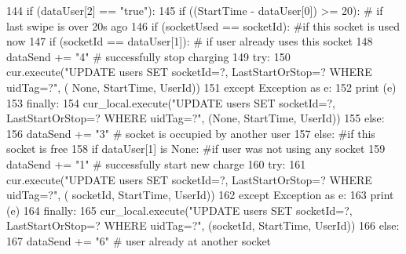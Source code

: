 \begin{DoxyCode}
144         \textcolor{keywordflow}{if} (dataUser[2] == \textcolor{stringliteral}{"true"}):
145             \textcolor{keywordflow}{if} ((StartTime - dataUser[0]) >= 20): \textcolor{comment}{# if last swipe is over 20s ago}
146                 \textcolor{keywordflow}{if} (socketUsed == socketId): \textcolor{comment}{#if this socket is used now}
147                     \textcolor{keywordflow}{if} (socketId == dataUser[1]): \textcolor{comment}{# if user already uses this socket}
148                         dataSend += \textcolor{stringliteral}{"4"} \textcolor{comment}{# successfully stop charging}
149                         \textcolor{keywordflow}{try}:
150                             cur.execute(\textcolor{stringliteral}{"UPDATE users SET socketId=?, LastStartOrStop=? WHERE uidTag=?"}, (\textcolor{keywordtype}{
      None}, StartTime, UserId))             
151                         \textcolor{keywordflow}{except} Exception \textcolor{keyword}{as} e:
152                             \textcolor{keywordflow}{print} (e)
153                         \textcolor{keywordflow}{finally}:
154                             cur\_local.execute(\textcolor{stringliteral}{"UPDATE users SET socketId=?, LastStartOrStop=? WHERE
       uidTag=?"}, (\textcolor{keywordtype}{None}, StartTime, UserId))
155                     \textcolor{keywordflow}{else}:
156                         dataSend += \textcolor{stringliteral}{"3"} \textcolor{comment}{# socket is occupied by another user }
157                 \textcolor{keywordflow}{else}: \textcolor{comment}{#if this socket is free}
158                     \textcolor{keywordflow}{if} dataUser[1] \textcolor{keywordflow}{is} \textcolor{keywordtype}{None}: \textcolor{comment}{#if user was not using any socket}
159                         dataSend += \textcolor{stringliteral}{"1"} \textcolor{comment}{# successfully start new charge}
160                         \textcolor{keywordflow}{try}:
161                             cur.execute(\textcolor{stringliteral}{"UPDATE users SET socketId=?, LastStartOrStop=? WHERE uidTag=?"}, (
      socketId, StartTime, UserId))
162                         \textcolor{keywordflow}{except} Exception \textcolor{keyword}{as} e:
163                             \textcolor{keywordflow}{print} (e)
164                         \textcolor{keywordflow}{finally}:
165                             cur\_local.execute(\textcolor{stringliteral}{"UPDATE users SET socketId=?, LastStartOrStop=? WHERE
       uidTag=?"}, (socketId, StartTime, UserId))
166                     \textcolor{keywordflow}{else}:
167                         dataSend += \textcolor{stringliteral}{"6"} \textcolor{comment}{# user already at another socket}

\end{DoxyCode}

